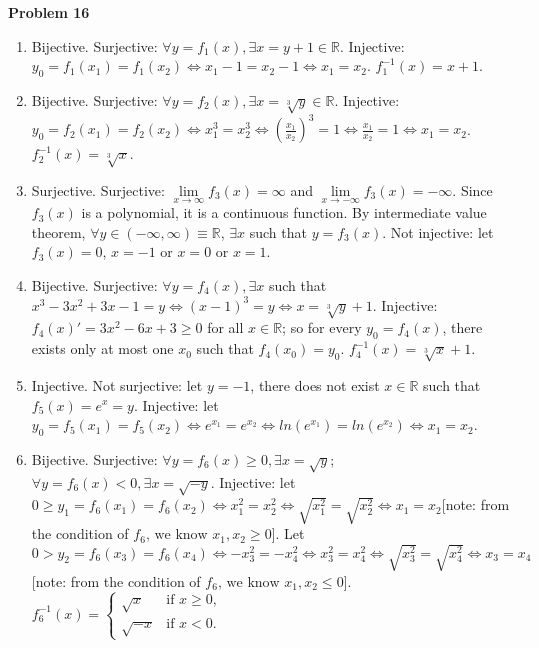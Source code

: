 \documentclass{article}
\begin{document}
\textbf{Problem 16}
\begin{enumerate}[label={(\roman*)}]
    \item Bijective. Surjective: $\forall y=f_1(x), \exists x = y +1\in \mathbb{R}$. Injective: $y_0=f_1(x_1)=f_1(x_2)\Leftrightarrow x_1-1=x_2-1\Leftrightarrow x_1=x_2$. $f_1^{-1}(x)=x+1$.
    \item Bijective. Surjective: $\forall y=f_2(x), \exists x = \sqrt[3]{y}\in \mathbb{R}$. Injective: $y_0=f_2(x_1)=f_2(x_2)\Leftrightarrow x_1^3=x_2^3\Leftrightarrow \left(\frac{x_1}{x_2}\right)^3=1\Leftrightarrow \frac{x_1}{x_2}=1\Leftrightarrow x_1=x_2$. $f_2^{-1}(x)=\sqrt[3]{x}$.
    \item Surjective. Surjective: $\lim\limits_{x\rightarrow \infty}f_3(x)=\infty$ and $\lim\limits_{x\rightarrow -\infty}f_3(x)=-\infty$. Since $f_3(x)$ is a polynomial, it is a continuous function. By intermediate value theorem, $\forall y  \in (-\infty,\infty)\equiv \mathbb{R}$, $\exists x$ such that $y=f_3(x)$. Not injective: let $f_3(x)=0$, $x=-1$ or $x=0$ or $x=1$. 
    \item Bijective. Surjective: $\forall y=f_4(x), \exists x$ such that $x^3-3x^2+3x-1=y \Leftrightarrow (x-1)^3=y \Leftrightarrow x=\sqrt[3]{y}+1$. Injective: $f_4(x)'=3x^2-6x+3\ge 0$ for all $x\in \mathbb{R}$; so for every $y_0=f_4(x)$, there exists only at most one $x_0$ such that $f_4(x_0)=y_0$. $f_4^{-1}(x)=\sqrt[3]{x}+1$. 
    \item Injective. Not surjective: let $y=-1$, there does not exist $x\in \mathbb{R}$ such that $f_5(x)=e^x=y$. Injective: let $y_0=f_5(x_1)=f_5(x_2)\Leftrightarrow e^{x_1}=e^{x_2}\Leftrightarrow ln(e^{x_1})=ln(e^{x_2})\Leftrightarrow x_1=x_2$.
    \item Bijective. Surjective: $\forall y = f_6(x) \ge 0, \exists x=\sqrt{y}$; $\forall y=f_6(x)<0,\exists x=\sqrt{-y}$. 
    Injective: let $0\ge y_1=f_6(x_1)=f_6(x_2)\Leftrightarrow x_1^2=x_2^2\Leftrightarrow\sqrt{x_1^2}=\sqrt{x_2^2}\Leftrightarrow x_1=x_2$[note: from the condition of $f_6\text{, we know }x_1,x_2\ge 0$]. 
    Let $0>y_2=f_6(x_3)=f_6(x_4)\Leftrightarrow -x_3^2=-x_4^2\Leftrightarrow x_3^2=x_4^2\Leftrightarrow\sqrt{x_3^2}=\sqrt{x_4^2}\Leftrightarrow x_3=x_4$[note: from the condition of $f_6\text{, we know }x_1,x_2\le 0$]. 
    $f_6^{-1}(x)=\begin{cases}
        \sqrt{x} & \text{if }x\ge 0,\\
        \sqrt{-x} & \text{if }x<0.
    \end{cases}$
\end{enumerate}
\end{document}
